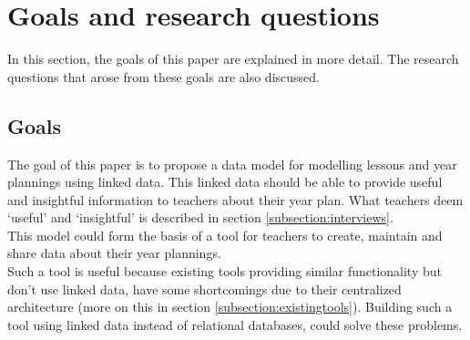 \documentclass[a4paper]{report}
\begin{document}
    \chapter{Goals and research questions}
    In this section, the goals of this paper are explained in more detail. The research questions that arose from these goals are also discussed.

    \section{Goals}
    \label{subsection:goals}
    The goal of this paper is to propose a data model for modelling lessons and year plannings using linked data.
    This linked data should be able to provide useful and insightful information to teachers about their year plan. What teachers deem `useful' and `insightful' is described in section \ref{subsection:interviews}.\\
    This model could form the basis of a tool for teachers to create, maintain and share data about their year plannings.\\
    Such a tool is useful because existing tools providing similar functionality but don't use linked data, have some shortcomings due to their centralized architecture (more on this in section \ref{subsection:existingtools}).
    Building such a tool using linked data instead of relational databases, could solve these problems.
\end{document}
